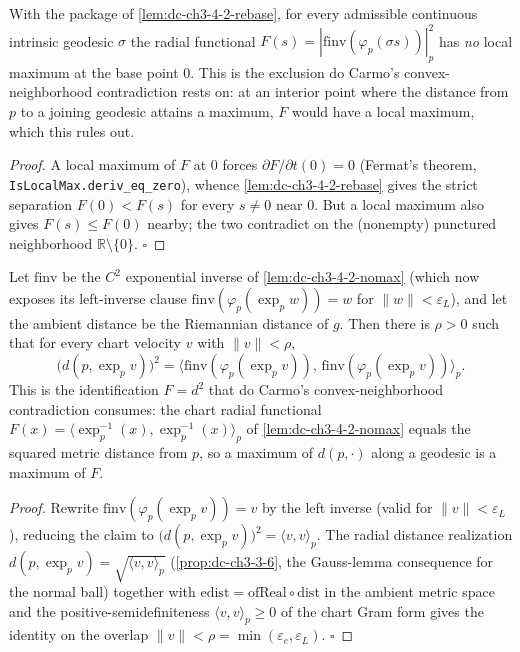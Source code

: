 \begin{lemma}
  \label{lem:dc-ch3-4-2-nomax}
  \leanok
  With the package of \cref{lem:dc-ch3-4-2-rebase}, for every admissible continuous intrinsic
  geodesic $\sigma$ the radial functional $F(s)=|\mathrm{finv}(\varphi_p(\sigma s))|_p^2$ has
  \emph{no} local maximum at the base point $0$. This is the exclusion do Carmo's
  convex-neighborhood contradiction rests on: at an interior point where the distance from $p$ to
  a joining geodesic attains a maximum, $F$ would have a local maximum, which this rules out.
\end{lemma}
\begin{proof}
  \leanok
  A local maximum of $F$ at $0$ forces $\partial F/\partial t(0)=0$ (Fermat's theorem,
  \texttt{IsLocalMax.deriv\_eq\_zero}), whence \cref{lem:dc-ch3-4-2-rebase} gives the strict
  separation $F(0)<F(s)$ for every $s\neq0$ near $0$. But a local maximum also gives $F(s)\le F(0)$
  nearby; the two contradict on the (nonempty) punctured neighborhood $\mathbb R\setminus\{0\}$.
  $\square$
\end{proof}

\begin{lemma}
  \label{lem:dc-ch3-4-2-bridge}
  \leanok
  Let $\mathrm{finv}$ be the $C^2$ exponential inverse of \cref{lem:dc-ch3-4-2-nomax} (which now
  exposes its left-inverse clause $\mathrm{finv}(\varphi_p(\exp_p w))=w$ for $\|w\|<\varepsilon_L$),
  and let the ambient distance be the Riemannian distance of $g$. Then there is $\rho>0$ such that
  for every chart velocity $v$ with $\|v\|<\rho$,
  $$ \big(d(p,\exp_p v)\big)^2 = \big\langle \mathrm{finv}(\varphi_p(\exp_p v)),\,
     \mathrm{finv}(\varphi_p(\exp_p v))\big\rangle_p . $$
  This is the identification $F=d^2$ that do Carmo's convex-neighborhood contradiction consumes:
  the chart radial functional $F(x)=\langle\exp_p^{-1}(x),\exp_p^{-1}(x)\rangle_p$ of
  \cref{lem:dc-ch3-4-2-nomax} equals the squared metric distance from $p$, so a maximum of
  $d(p,\cdot)$ along a geodesic is a maximum of $F$.
\end{lemma}
\begin{proof}
  \leanok
  Rewrite $\mathrm{finv}(\varphi_p(\exp_p v))=v$ by the left inverse (valid for $\|v\|<\varepsilon_L$),
  reducing the claim to $\big(d(p,\exp_p v)\big)^2=\langle v,v\rangle_p$. The radial distance
  realization $d(p,\exp_p v)=\sqrt{\langle v,v\rangle_p}$ (\cref{prop:dc-ch3-3-6}, the Gauss-lemma
  consequence for the normal ball) together with $\mathrm{edist}=\mathrm{ofReal}\circ\mathrm{dist}$ in
  the ambient metric space and the positive-semidefiniteness $\langle v,v\rangle_p\ge0$ of the chart
  Gram form gives the identity on the overlap $\|v\|<\rho=\min(\varepsilon_e,\varepsilon_L)$. $\square$
\end{proof}


